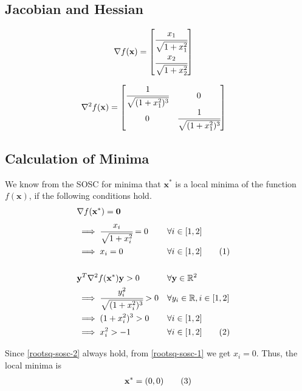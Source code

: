 \documentclass[a4paper]{article}
\newcommand\numberthis{\addtocounter{equation}{1}\tag{\theequation}}
\begin{document}
\subsection{Jacobian and Hessian}

\begin{align*}
\nabla f(\textbf{x}) &=
    \begin{bmatrix}
        \cfrac{x_1}{\sqrt{1 + x_1^2}} \\
        \cfrac{x_2}{\sqrt{1 + x_2^2}}
    \end{bmatrix}
\end{align*}

\begin{align*}
\nabla^2 f(\textbf{x}) &=
    \begin{bmatrix}
        \cfrac{1}{\sqrt{(1 + x_1^2)^3}} & 0 \\
        0 & \cfrac{1}{\sqrt{(1 + x_1^2)^3}} \\
    \end{bmatrix}
\end{align*}

\subsection{Calculation of Minima}

We know from the SOSC for minima that $\textbf{x}^*$ is a local minima of the function $f(\textbf{x})$, if the following conditions hold.
\begin{align*}
&\nabla f(\textbf{x}^*) = \textbf{0} \\
&\implies \cfrac{x_i}{\sqrt{1 + x_i^2}} = 0 &&\forall i \in [1, 2] \\
&\implies x_i = 0 &&\forall i \in [1, 2] \numberthis \label{rootsq-sosc-1} \\ \\
&\textbf{y}^T \nabla^2 f(\textbf{x}^*) \textbf{y} > 0 &&\forall \textbf{y} \in \mathbb{R}^2 \\
&\implies \cfrac{y_i^2}{\sqrt{(1 + x_i^2)^3}} > 0 &&\forall y_i \in \mathbb{R}, i \in [1, 2] \\
&\implies (1 + x_i^2)^3 > 0 &&\forall i \in [1, 2] \\
&\implies x_i^2 > -1 &&\forall i \in [1, 2] \numberthis \label{rootsq-sosc-2}
\end{align*}

Since \eqref{rootsq-sosc-2} always hold, from \eqref{rootsq-sosc-1} we get $x_i = 0$. Thus, the local minima is
\begin{align*}
\textbf{x}^* = (0, 0) \numberthis \label{rootsq-minima}
\end{align*}
\end{document}
